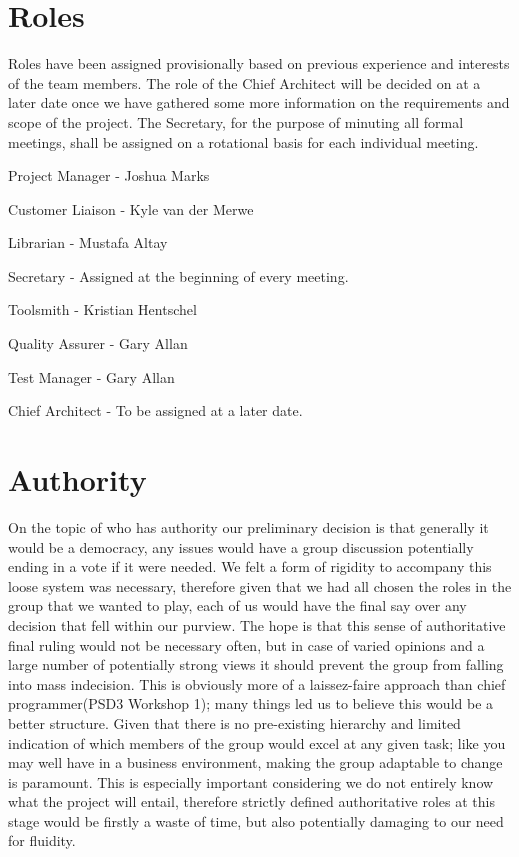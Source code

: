 \documentclass{l3deliverable}
\begin{document}

\section{Roles}

Roles have been assigned provisionally based on previous experience and interests of the team members. The role of the Chief Architect will be decided on at a later date once we have gathered some more information on the requirements and scope of the project. The Secretary, for the purpose of minuting all formal meetings, shall be assigned on a rotational basis for each individual meeting.

\begin{list}{}{}
\item Project Manager - Joshua Marks
\item Customer Liaison - Kyle van der Merwe
\item Librarian - Mustafa Altay
\item Secretary - Assigned at the beginning of every meeting.
\item Toolsmith - Kristian Hentschel
\item Quality Assurer - Gary Allan
\item Test Manager - Gary Allan
\item Chief Architect - To be assigned at a later date.
\end{list}



\section{Authority}
On the topic of who has authority our preliminary decision is that generally it would be a democracy, any issues would have a group discussion potentially ending in a vote if it were needed.
We felt a form of rigidity to accompany this loose system was necessary, therefore given that we had all chosen the roles in the group that we wanted to play, each of us would have the final say over any decision that fell within our purview.
The hope is that this sense of authoritative final ruling would not be necessary often, but in case of varied opinions and a large number of potentially strong views it should prevent the group from falling into mass indecision. This is obviously more of a laissez-faire approach than chief programmer(PSD3 Workshop 1); many things led us to believe this would be a better structure. %
Given that there is no pre-existing hierarchy and limited indication of which members of the group would excel at any given task; like you may well have in a business environment, making the group adaptable to change is paramount. This is especially important considering we do not entirely know what the project will entail, therefore strictly defined authoritative roles at this stage would be firstly a waste of time, but also potentially damaging to our need for fluidity. %
\end{document}
